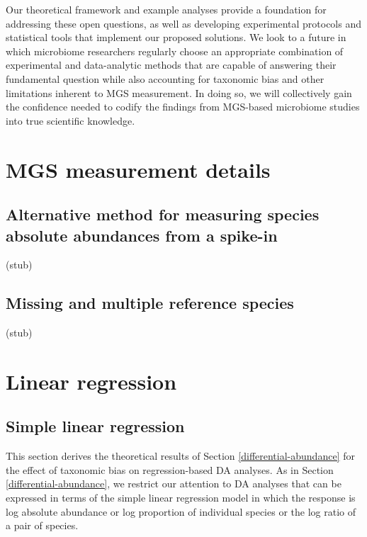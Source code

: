 \documentclass[
]{article}
\begin{document}
Our theoretical framework and example analyses provide a foundation for addressing these open questions, as well as developing experimental protocols and statistical tools that implement our proposed solutions.
We look to a future in which microbiome researchers regularly choose an appropriate combination of experimental and data-analytic methods that are capable of answering their fundamental question while also accounting for taxonomic bias and other limitations inherent to MGS measurement.
In doing so, we will collectively gain the confidence needed to codify the findings from MGS-based microbiome studies into true scientific knowledge.

\hypertarget{appendix-appendix}{%
\appendix {}}


\hypertarget{mgs-measurement-details}{%
\section{MGS measurement details}\label{mgs-measurement-details}}

\hypertarget{spike-in-alt}{%
\subsection{Alternative method for measuring species absolute abundances from a spike-in}\label{spike-in-alt}}

(stub)

\hypertarget{multiple-references}{%
\subsection{Missing and multiple reference species}\label{multiple-references}}

(stub)

\hypertarget{appendix-regression}{%
\section{Linear regression}\label{appendix-regression}}

\hypertarget{simple-linear-regression}{%
\subsection{Simple linear regression}\label{simple-linear-regression}}

This section derives the theoretical results of Section \ref{differential-abundance} for the effect of taxonomic bias on regression-based DA analyses.
As in Section \ref{differential-abundance}, we restrict our attention to DA analyses that can be expressed in terms of the simple linear regression model in which the response is log absolute abundance or log proportion of individual species or the log ratio of a pair of species.
\end{document}
